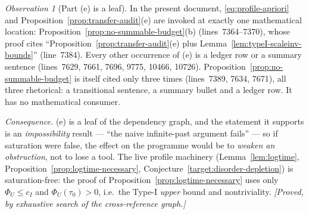 \documentclass[11pt]{article}
\theoremstyle{definition}
\theoremstyle{remark}
\newtheorem{observation}[theorem]{Observation}
\begin{document}
\begin{observation}[Part (e) is a leaf]\label{obs:s50-leaf}
  In the present document, \eqref{eq:profile-apriori} and
  Proposition~\ref{prop:transfer-audit}(e) are invoked at exactly one
  mathematical location: Proposition~\ref{prop:no-summable-budget}(b)
  (lines~7364--7370), whose proof cites ``Proposition~\ref{prop:transfer-audit}(e)
  plus Lemma~\ref{lem:typeI-scaleinv-bounds}'' (line~7384). Every other
  occurrence of (e) is a ledger row or a summary sentence
  (lines~7629, 7661, 7696, 9775, 10466, 10726). Proposition~\ref{prop:no-summable-budget}
  is itself cited only three times (lines~7389, 7634, 7671), all three
  rhetorical: a transitional sentence, a summary bullet and a ledger row. It
  has no mathematical consumer.

  \emph{Consequence.} (e) is a leaf of the dependency graph, and the statement
  it supports is an \emph{impossibility} result --- ``the naive infinite-past
  argument fails'' --- so if saturation were false, the effect on the
  programme would be to \emph{weaken an obstruction}, not to lose a tool.
  The live profile machinery (Lemma~\ref{lem:logtime},
  Proposition~\ref{prop:logtime-necessary},
  Conjecture~\ref{target:disorder-depletion}) is saturation-free: the proof of
  Proposition~\ref{prop:logtime-necessary} uses only $\Phi_U\leq c_I$ and
  $\Phi_U(\tau_0)>0$, i.e.\ the Type-I \emph{upper} bound and nontriviality.
  \emph{[Proved, by exhaustive search of the cross-reference graph.]}
\end{observation}
\end{document}

